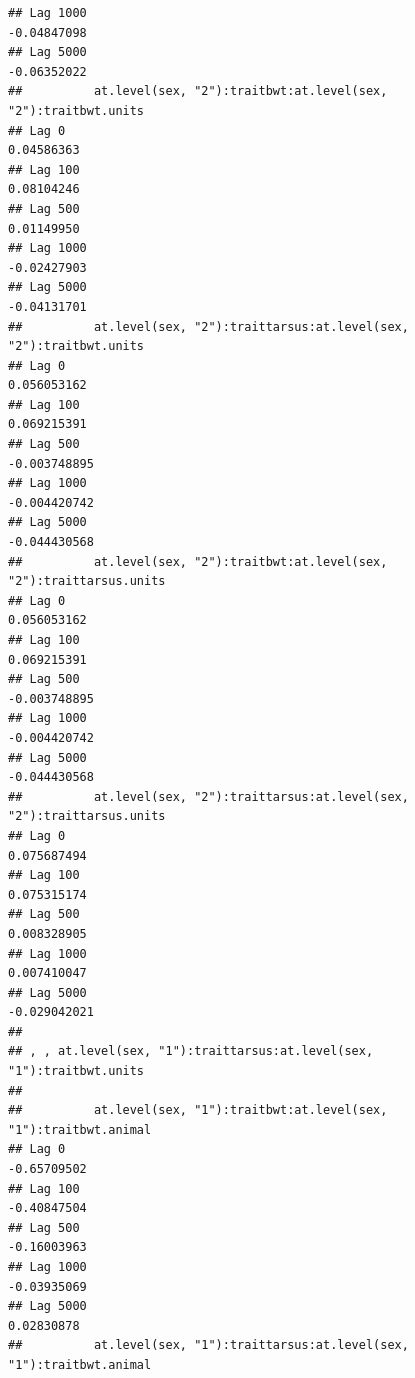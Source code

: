 \documentclass[
  12pt,
]{book}
\begin{document}
\begin{verbatim}
## Lag 1000                                                         -0.04847098
## Lag 5000                                                         -0.06352022
##          at.level(sex, "2"):traitbwt:at.level(sex, "2"):traitbwt.units
## Lag 0                                                       0.04586363
## Lag 100                                                     0.08104246
## Lag 500                                                     0.01149950
## Lag 1000                                                   -0.02427903
## Lag 5000                                                   -0.04131701
##          at.level(sex, "2"):traittarsus:at.level(sex, "2"):traitbwt.units
## Lag 0                                                         0.056053162
## Lag 100                                                       0.069215391
## Lag 500                                                      -0.003748895
## Lag 1000                                                     -0.004420742
## Lag 5000                                                     -0.044430568
##          at.level(sex, "2"):traitbwt:at.level(sex, "2"):traittarsus.units
## Lag 0                                                         0.056053162
## Lag 100                                                       0.069215391
## Lag 500                                                      -0.003748895
## Lag 1000                                                     -0.004420742
## Lag 5000                                                     -0.044430568
##          at.level(sex, "2"):traittarsus:at.level(sex, "2"):traittarsus.units
## Lag 0                                                            0.075687494
## Lag 100                                                          0.075315174
## Lag 500                                                          0.008328905
## Lag 1000                                                         0.007410047
## Lag 5000                                                        -0.029042021
## 
## , , at.level(sex, "1"):traittarsus:at.level(sex, "1"):traitbwt.units
## 
##          at.level(sex, "1"):traitbwt:at.level(sex, "1"):traitbwt.animal
## Lag 0                                                       -0.65709502
## Lag 100                                                     -0.40847504
## Lag 500                                                     -0.16003963
## Lag 1000                                                    -0.03935069
## Lag 5000                                                     0.02830878
##          at.level(sex, "1"):traittarsus:at.level(sex, "1"):traitbwt.animal

\end{verbatim}
\end{document}
